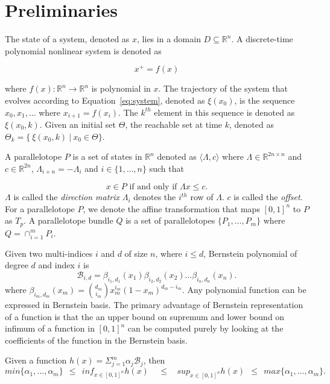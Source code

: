 \documentclass[EPiC]{easychair}
\begin{document}
\section{Preliminaries}

The state of a system, denoted as $x$, lies in a domain $D \subseteq \mathbb{R}^n$. A discrete-time polynomial nonlinear system is denoted as

\begin{equation}
    x^{+} = f(x)
\label{eq:system}
\end{equation}

where $f(x) : \mathbb{R}^n \rightarrow \mathbb{R}^n$ is polynomial in $x$. 
%
The trajectory of the system that evolves according to Equation~\ref{eq:system}, denoted as $\xi(x_0)$, is the sequence $x_0, x_1, \ldots$ where $x_{i+1} = f(x_i)$. 
%
The $k^{th}$ element in this sequence is denoted as $\xi(x_0,k)$.
%
Given an initial set $\Theta$, the reachable set at time $k$, denoted as $\Theta_{k} = \{~ \xi(x_0,k)~|~ x_0 \in \Theta\}$.

A parallelotope $P$ is a set of states in $\mathbb{R}^{n}$ denoted as $\langle \Lambda, c\rangle$ where $\Lambda \in \mathbb{R}^{2n \times n}$ and $c \in \mathbb{R}^{2n}$, $\Lambda_{i+n} = -\Lambda_{i}$ and $i \in \{1, \ldots, n\}$ such that

$$
x \in P \mbox{ if and only if } \Lambda x \leq c.
$$
$\Lambda$ is called the \emph{direction matrix} $\Lambda_i$ denotes the $i^{th}$ row of $\Lambda$. $c$ is called the \emph{offset}. For a parallelotope $P$, we denote the affine transformation that maps $[0,1]^{n}$ to $P$ as $T_{p}$. A parallelotope bundle $Q$ is a set of parallelotopes $\{P_1, \ldots, P_m\}$ where $Q = \cap_{i=1}^{m}P_i$.

Given two multi-indices $i$ and $d$ of size $n$, where $i \leq d$, Bernstein polynomial of degree $d$ and index $i$ is 
$$
\mathcal{B}_{i,d} = \beta_{i_1,d_1}(x_1) \beta_{i_2,d_2}(x_2)\ldots \beta_{i_n,d_n}(x_n).
$$
%
where $\beta_{i_m,d_m}(x_m) = \binom{d_m}{i_m}x_{m}^{i_m}(1-x_m)^{d_m - i_m}$. 
%
Any polynomial function can be expressed in Bernstein basis. 
%
The primary advantage of Bernstein representation of a function is that the an upper bound on supremum and lower bound on infimum of a function in $[0,1]^{n}$ can be computed purely by looking at the coefficients of the function in the Bernstein basis.

Given a function $h(x) = \Sigma_{j=1}^{m} \alpha_j \mathcal{B}_{j}$, then
$$
min \{\alpha_1, \ldots, \alpha_m\} ~~\leq~~ inf_{x \in [0,1]^n} h(x) ~~~~~\leq~~~~ sup_{x \in [0,1]^{n}} h(x) ~~\leq~~ max \{\alpha_1, \ldots, \alpha_m\}.
$$
\end{document}
